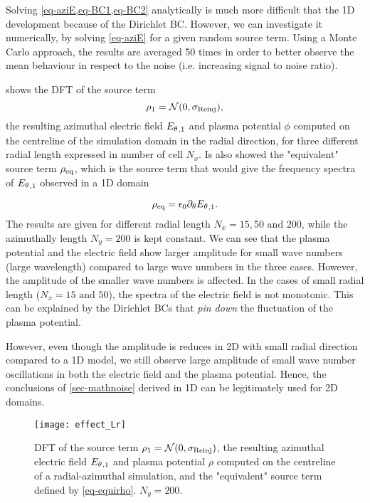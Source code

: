       Solving \cref{eq-aziE,eq-BC1,eq-BC2} analytically is much more difficult that the \ac{1D} development because of the Dirichlet \ac{BC}.
      However, we can investigate it numerically, by solving \cref{eq-aziE} for a given random source term.
      Using a Monte Carlo approach, the results are averaged 50 times in order to better observe the mean behaviour in respect to the noise (i.e. increasing signal to noise ratio).
        
       shows the \ac{DFT} of the source term \[\rho_1 = \mathcal{N}(0, \sigma_{\rm Reinj}),\] the resulting azimuthal electric field ${E_{\theta}}_{, 1}$ and plasma potential $\phi$ computed on the centreline of the simulation domain in the radial direction, for three different radial length expressed in number of cell $N_x$.
      Is also showed the "equivalent" source term $\rho_{\rm eq}$, which is the source term that would give the frequency spectra of ${E_{\theta}}_{, 1}$ observed in a \ac{1D} domain
      
      \begin{equation} \label{eq-equirho}
        \rho_{\rm eq} = \epsilon_0 \partial_\theta {\ensuremath{E_{\theta}}}_{, 1}.
      \end{equation}
      The results are given for different radial length $N_x=15,50 \text{ and } 200$, while the azimuthally length $N_y=200$ is kept constant.
      We can see that the plasma potential and the electric field show larger amplitude for small wave numbers (large wavelength) compared to large wave numbers in the three cases.
      However, the amplitude of the smaller wave numbers is affected.
      In the cases of small radial length ($N_x=15 \text{ and } 50$), the spectra of the electric field is not monotonic.
      This can be explained by the Dirichlet \ac{BC}s that {\it pin down} the fluctuation of the plasma potential.
      
      However, even though the amplitude is reduces in \ac{2D} with small radial direction compared to a \ac{1D} model, we still observe large amplitude of small wave number oscillations in both the electric field and the plasma potential.
      Hence, the conclusions of  \cref{sec-mathnoise} derived in \ac{1D} can be legitimately used for \ac{2D} domains.
      
      
      
      \begin{figure}[hbtp]
        \centering
        \texttt{[image: effect\_Lr]}
        \caption{\ac{DFT} of the source term $\rho_1 = \mathcal{N}(0, \sigma_{\rm Reinj})$, the resulting azimuthal electric field ${E_{\theta}}_{, 1}$ and plasma potential $\rho$ computed on the centreline of a radial-azimuthal simulation, and the "equivalent" source term defined by \cref{eq-equirho}. $N_y=200$. }
        \label{fig-dftLr}
      \end{figure}
      
      





